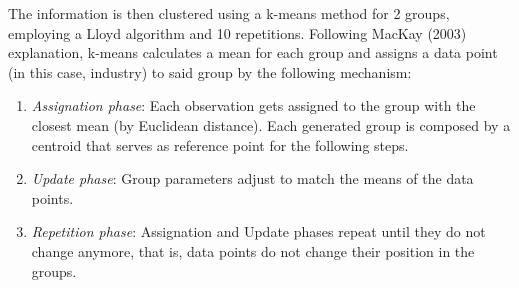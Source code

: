 \documentclass[12pt,a4paper]{article}
\begin{document}
The information is then clustered using a k-means method for 2 groups, employing a Lloyd algorithm and 10 repetitions. Following MacKay (2003) explanation, k-means calculates a mean for each group and assigns a data point (in this case, industry) to said group by the following mechanism: 

\begin{enumerate}
	\item \textit{Assignation phase}: Each observation gets assigned to the group with the closest mean (by Euclidean distance). Each generated group is composed by a centroid that serves as reference point for the following steps.  
	\item \textit{Update phase}: Group parameters adjust to match the means of the data points. 
	\item \textit{Repetition phase}: Assignation and Update phases repeat until they do not change anymore, that is, data points do not change their position in the groups. 
\end{enumerate}
\end{document}
